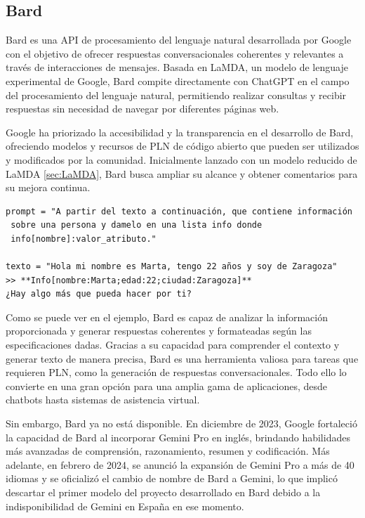 \subsection{Bard}
Bard es una API de procesamiento del lenguaje natural desarrollada por Google con el objetivo de ofrecer respuestas conversacionales coherentes y relevantes a través de interacciones de mensajes. Basada en LaMDA, un modelo de lenguaje experimental de Google, Bard compite directamente con ChatGPT en el campo del procesamiento del lenguaje natural, permitiendo realizar consultas y recibir respuestas sin necesidad de navegar por diferentes páginas web.

Google ha priorizado la accesibilidad y la transparencia en el desarrollo de Bard, ofreciendo modelos y recursos de PLN de código abierto que pueden ser utilizados y modificados por la comunidad. Inicialmente lanzado con un modelo reducido de LaMDA \ref{sec:LaMDA}, Bard busca ampliar su alcance y obtener comentarios para su mejora continua.

\begin{verbatim}
prompt = "A partir del texto a continuación, que contiene información
 sobre una persona y damelo en una lista info donde
 info[nombre]:valor_atributo."

texto = "Hola mi nombre es Marta, tengo 22 años y soy de Zaragoza"
>> **Info[nombre:Marta;edad:22;ciudad:Zaragoza]** 
¿Hay algo más que pueda hacer por ti?
\end{verbatim}

Como se puede ver en el ejemplo, Bard es capaz de analizar la información proporcionada y generar respuestas coherentes y formateadas según las especificaciones dadas. Gracias a su capacidad para comprender el contexto y generar texto de manera precisa, Bard es una herramienta valiosa para tareas que requieren PLN, como la generación de respuestas conversacionales. Todo ello lo convierte en una gran opción para una amplia gama de aplicaciones, desde chatbots hasta sistemas de asistencia virtual. 

Sin embargo, Bard ya no está disponible. En diciembre de 2023, Google fortaleció la capacidad de Bard al incorporar Gemini Pro en inglés, brindando habilidades más avanzadas de comprensión, razonamiento, resumen y codificación. Más adelante, en febrero de 2024, se anunció la expansión de Gemini Pro a más de 40 idiomas y se oficializó el cambio de nombre de Bard a Gemini, lo que implicó descartar el primer modelo del proyecto desarrollado en Bard debido a la indisponibilidad de Gemini en España en ese momento.


